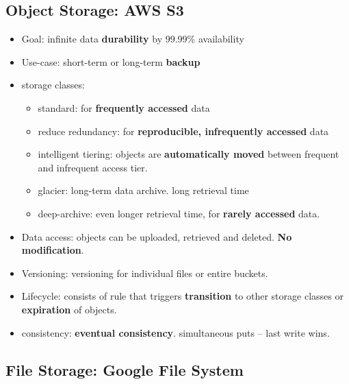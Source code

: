 \subsection{Object Storage: AWS S3}
\begin{itemize}
	\item Goal: infinite data \textbf{durability} by 99.99\% availability
	\item Use-case: short-term or long-term \textbf{backup}
	\item storage classes:
	\begin{itemize}
		\item standard: for \textbf{frequently accessed} data
		\item reduce redundancy: for \textbf{reproducible, infrequently accessed} data
		\item intelligent tiering: objects are \textbf{automatically moved} between frequent and infrequent access tier.
		\item glacier: long-term data archive. long retrieval time
		\item deep-archive: even longer retrieval time, for \textbf{rarely accessed} data.
	\end{itemize}
	\item Data access: objects can be uploaded, retrieved and deleted. \textbf{No modification}.
	\item Versioning: versioning for individual files or entire buckets.
	\item Lifecycle: consists of rule that triggers \textbf{transition} to other storage classes or \textbf{expiration} of objects.
	\item consistency: \textbf{eventual consistency}. simultaneous puts -- last write wins.
\end{itemize}


\subsection{File Storage: Google File System}

